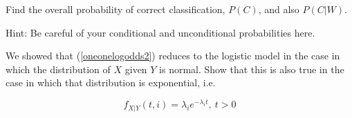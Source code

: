 Find the overall probability of correct classification, $P(C)$, and also
$P(C | W)$.

Hint:  Be careful of your conditional and unconditional probabilities
here.

\oneproblem
We showed that (\ref{oneonelogodds2}) reduces to the logistic model in
the case in which the distribution of $X$ given $Y$ is normal.  Show
that this is also true in the case in which that distribution is
exponential, i.e.

\begin{equation}
f_{X|Y}(t,i) = \lambda_i e^{-\lambda_i t}, ~ t > 0
\end{equation}

% 
% 
% 
% 
